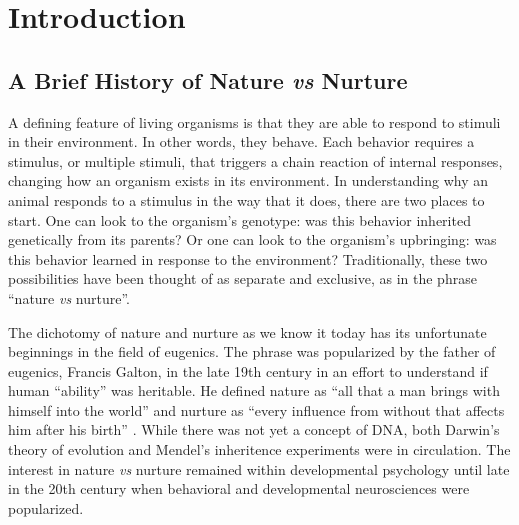 \documentclass[12pt,twoside]{reedthesis}
\begin{document}
    \chapter{Introduction}

 \doublespacing
\section{A Brief History of Nature \textit{vs} Nurture}		
A defining feature of living organisms is that they are able to respond to
stimuli in their environment. In other words, they behave. Each behavior
requires a stimulus, or multiple stimuli, that triggers a chain
reaction of internal responses, changing how an organism exists in its
environment. In understanding why an animal responds to a stimulus in the way
that it does, there
are two places to start. One can look to the organism's genotype:
was this behavior inherited genetically from its parents? Or one can look to the
organism's upbringing: was this behavior learned in response to
the environment? Traditionally, these two possibilities have been thought of as
separate and exclusive, as in the phrase ``nature \textit{vs} nurture''.  

The dichotomy of nature and nurture as we know it today has its unfortunate beginnings in
the field of eugenics. The phrase was popularized by the father of eugenics, Francis
Galton, in the late 19th century in an effort to understand if human ``ability''
was heritable. He defined nature as ``all that a man brings with himself into
the world'' and nurture as ``every influence from without that affects him after
his birth'' \citep{galton_english_1874}. While there was not yet a concept of DNA, both
Darwin's theory of evolution and Mendel's inheritence experiments were in
circulation. The interest in nature \textit{vs} nurture remained within developmental
psychology until late in the 20th century when behavioral and developmental
neurosciences were popularized.
\end{document}
